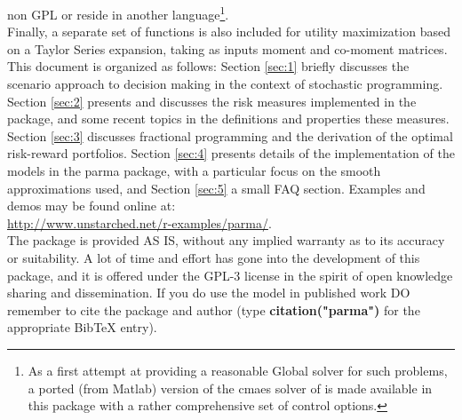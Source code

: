 non GPL or reside in another language\footnote{As a first attempt at
providing a reasonable Global solver for such problems, a ported (from
Matlab) version of the cmaes solver of  is made
available in this package with a rather comprehensive set of control
options.}. \\
Finally, a separate set of functions is also included for utility maximization
based on a Taylor Series expansion, taking as inputs moment and
co-moment matrices.\\
This document is organized as follows: Section \ref{sec:1} briefly discusses
the scenario approach to decision making in the context of stochastic
programming. Section \ref{sec:2} presents and discusses the risk measures
implemented in the package, and some recent topics in the definitions and
properties these measures. Section \ref{sec:3} discusses fractional
programming and the derivation of the optimal risk-reward portfolios. Section
\ref{sec:4} presents details of the implementation of the models in the parma
package, with a particular focus on the smooth approximations used, and
Section \ref{sec:5} a small FAQ section. Examples and demos may be found
online at:\\
 \url{http://www.unstarched.net/r-examples/parma/}.\\

The package is provided AS IS, without any implied warranty as to its accuracy
or suitability. A lot of time and effort has gone into the development of this
package, and it is offered under the GPL-3 license in the spirit of open
knowledge sharing and dissemination. If you do use the model in published work
DO remember to cite the package and author (type \textbf{citation("parma")} for
the appropriate BibTeX entry).

